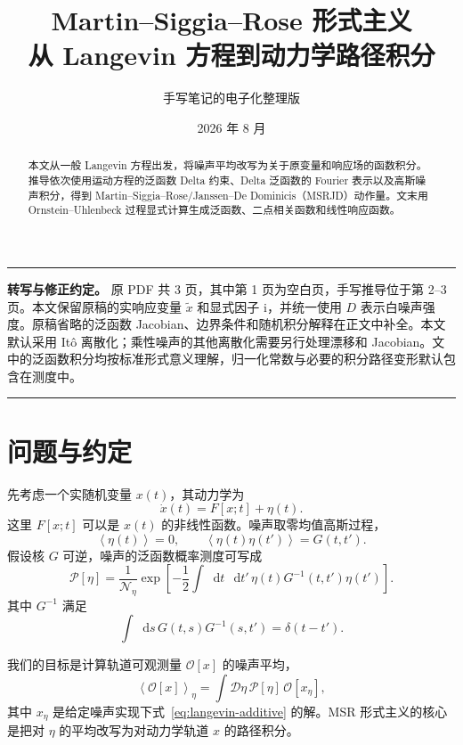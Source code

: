 \documentclass[UTF8,11pt,a4paper]{ctexart}
\title{\bfseries Martin--Siggia--Rose 形式主义\\[0.4em]
  \large 从 Langevin 方程到动力学路径积分}
\author{手写笔记的电子化整理版}
\date{2026 年 8 月}
\newcommand{\dd}{\mathop{}\!\mathrm{d}}
\newcommand{\ii}{\mathrm{i}}
\newcommand{\D}{\mathcal D}
\newcommand{\avg}[1]{\left\langle #1\right\rangle}
\newenvironment{keybox}
  {\begin{center}\begin{minipage}{0.92\linewidth}\color{noteborder}\hrule\vspace{0.55em}\color{black}}
  {\vspace{0.45em}\color{noteborder}\hrule\end{minipage}\end{center}}
\begin{document}
\maketitle

\begin{abstract}
本文从一般 Langevin 方程出发，将噪声平均改写为关于原变量和响应场的函数积分。推导依次使用运动方程的泛函数 Delta 约束、Delta 泛函数的 Fourier 表示以及高斯噪声积分，得到 Martin--Siggia--Rose/Janssen--De Dominicis（MSRJD）动作量。文末用 Ornstein--Uhlenbeck 过程显式计算生成泛函数、二点相关函数和线性响应函数。
\end{abstract}

\begin{keybox}
\textbf{转写与修正约定。}
原 PDF 共 3 页，其中第 1 页为空白页，手写推导位于第 2--3 页。本文保留原稿的实响应变量 $\widetilde x$ 和显式因子 $\ii$，并统一使用 $D$ 表示白噪声强度。原稿省略的泛函数 Jacobian、边界条件和随机积分解释在正文中补全。本文默认采用 It\^o 离散化；乘性噪声的其他离散化需要另行处理漂移和 Jacobian。文中的泛函数积分均按标准形式意义理解，归一化常数与必要的积分路径变形默认包含在测度中。
\end{keybox}

\tableofcontents
\newpage

\section{问题与约定}

先考虑一个实随机变量 $x(t)$，其动力学为
\begin{equation}
  \dot x(t)=F[x;t]+\eta(t).
  \label{eq:langevin-additive}
\end{equation}
这里 $F[x;t]$ 可以是 $x(t)$ 的非线性函数。噪声取零均值高斯过程，
\begin{equation}
  \avg{\eta(t)}=0,
  \qquad
  \avg{\eta(t)\eta(t')}=G(t,t').
  \label{eq:noise-covariance}
\end{equation}
假设核 $G$ 可逆，噪声的泛函数概率测度可写成
\begin{equation}
  \mathcal P[\eta]
  =\frac{1}{\mathcal N_\eta}
   \exp\!\left[
   -\frac12\int\dd t\,\dd t'\,
   \eta(t)G^{-1}(t,t')\eta(t')
   \right].
  \label{eq:noise-measure}
\end{equation}
其中 $G^{-1}$ 满足
\begin{equation}
  \int\dd s\,G(t,s)G^{-1}(s,t')=\delta(t-t').
\end{equation}

我们的目标是计算轨道可观测量 $\mathcal O[x]$ 的噪声平均，
\begin{equation}
  \avg{\mathcal O[x]}_\eta
  =\int\D\eta\,\mathcal P[\eta]\,\mathcal O[x_\eta],
  \label{eq:observable-noise-average}
\end{equation}
其中 $x_\eta$ 是给定噪声实现下式~\eqref{eq:langevin-additive} 的解。MSR 形式主义的核心是把对 $\eta$ 的平均改写为对动力学轨道 $x$ 的路径积分。
\end{document}
